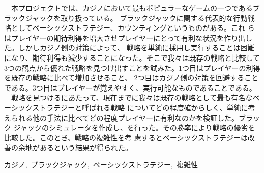 \documentclass[11pt,a4paper,oneside]{jsbook}
\begin{document}
\maketitle
{}
\fontsize{10}{18}\selectfont
\frontmatter

\begin{jabstract} 
\ \ 本プロジェクトでは、カジノにおいて最もポピュラーなゲームの一つであるブラックジャックを取り扱っている。
ブラックジャックに関する代表的な行動戦略としてベーシックストラテジー、カウンティングというものがある。これ
らはプレイヤーの期待利得を増大させプレイヤーにとって有利な状況を作り出した。しかしカジノ側の対策によって、
戦略を単純に採用し実行することは困難になり、期待利得も減少することになった。そこで我々は既存の戦略と比較して
 3つの観点から優れた戦略を見つけ出すことを試みた。1つ目はプレイヤーの利得を既存の戦略に比べて増加させること、
 2つ目はカジノ側の対策を回避することである。3つ目はプレイヤーが覚えやすく、実行可能なものであることである。\\

\ \ 戦略を見つけるにあたって、現在までに我々は既存の戦略として最も有名なベーシックストラテジーと呼ばれる戦略
についてどの程度確からしく、単純に考えられる他の手法に比べてどの程度プレイヤーに有利なのかを検証した。ブラック
ジャックのシミュレータを作成し、を行った。その勝率により戦略の優劣を比較した。このとき、戦略の複雑性を考
慮するとベーシックストラテジーは改善の余地があるという結果が得られた。
\begin{jkeyword}
カジノ,\ ブラックジャック,\ ベーシックストラテジー,\ 複雑性
\end{jkeyword}
\end{jabstract}
\end{document}
